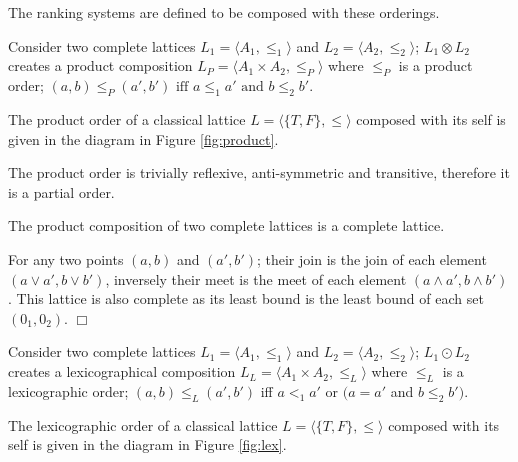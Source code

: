 The ranking systems are defined to be composed with these orderings.

\begin{defs}
\label{def:product_order}
Consider two complete lattices $L_1 = \langle A_1, \leq_1 \rangle$ and $L_2 = \langle A_2, \leq_2 \rangle$;
$L_1 \otimes L_2$ creates a product composition $L_P = \langle A_1 \times A_2, \leq_P \rangle$
where $\leq_P$ is a product order; 
$(a,b) \leq_{P} (a',b') \mbox{ iff } a \leq_{1} a' \mbox{ and } b \leq_{2} b'$.
\end{defs}

The product order of a classical lattice $L = \langle \{T,F\}, \leq \rangle$ 
composed with its self is given in the diagram in Figure \ref{fig:product}.

The product order is trivially reflexive, anti-symmetric and transitive, therefore it is a partial order.
\begin{prop}
The product composition of two complete lattices is a complete lattice.  
\end{prop}
\begin{prof}
For any two points $(a,b)$ and $(a',b')$;
their join is the join of each element $(a \vee a', b \vee b')$, 
inversely their meet is the meet of each element $(a \wedge a', b \wedge b')$.
This lattice is also complete as its least bound is the least bound of each set $(0_1,0_2)$.
$\Box$\end{prof}

\begin{defs}
\label{def:lex_order}
Consider two complete lattices $L_1 = \langle A_1, \leq_1 \rangle$ and $L_2 = \langle A_2, \leq_2 \rangle$;
$L_1 \odot L_2$ creates a lexicographical composition  $L_L = \langle A_1 \times A_2, \leq_L \rangle$
where $\leq_L$ is a lexicographic order;
$(a,b) \leq_{L} (a',b')$ iff $a <_{1} a'$ or $(a = a'$ and $b \leq_{2} b')$.
\end{defs}

The lexicographic order of a classical lattice $L = \langle \{T,F\}, \leq \rangle$ 
composed with its self is given in the diagram in Figure \ref{fig:lex}.

